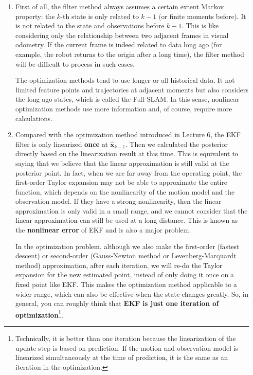 \begin{enumerate}
	\item 
	First of all, the filter method always assumes a certain extent Markov property: the $k$-th state is only related to $k-1$ (or finite moments before). It is not related to the state and observations before $k-1$. This is like considering only the relationship between two adjacent frames in visual odometry. If the current frame is indeed related to data long ago (for example, the robot returns to the origin after a long time), the filter method will be difficult to process in such cases.
	
	The optimization methods tend to use longer or all historical data. It not limited feature points and trajectories at adjacent moments but also considers the long ago states, which is called the Full-SLAM. In this sense, nonlinear optimization methods use more information and, of course, require more calculations.
	
	\item 
	Compared with the optimization method introduced in Lecture 6, the EKF filter is only linearized \textbf{once} at $\mathbf{\hat{x}}_{k-1}$. Then we calculated the posterior directly based on the linearization result at this time. This is equivalent to saying that we believe that the linear approximation is still valid at the posterior point. In fact, when we are far away from the operating point, the first-order Taylor expansion may not be able to approximate the entire function, which depends on the nonlinearity of the motion model and the observation model. If they have a strong nonlinearity, then the linear approximation is only valid in a small range, and we cannot consider that the linear approximation can still be used at a long distance. This is known as the \textbf{nonlinear error} of EKF and is also a major problem.
	
	In the optimization problem, although we also make the first-order (fastest descent) or second-order (Gauss-Newton method or Levenberg-Marquardt method) approximation, after each iteration, we will re-do the Taylor expansion for the new estimated point, instead of only doing it once on a fixed point like EKF. This makes the optimization method applicable to a wider range, which can also be effective when the state changes greatly. So, in general, you can roughly think that \textbf{EKF is just one iteration of optimization}\footnote{Technically, it is better than one iteration because the linearization of the update step is based on prediction. If the motion and observation model is linearized simultaneously at the time of prediction, it is the same as an iteration in the optimization. }.
	

\end{enumerate}
